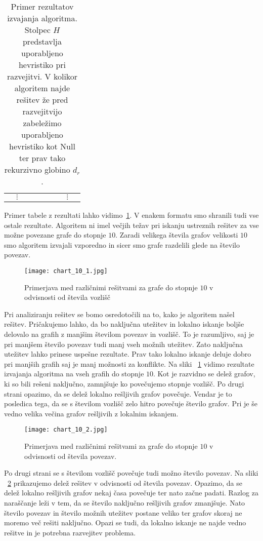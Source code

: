 \documentclass[12pt,a4paper,twoside]{article}
\theoremstyle{definition} %
\theoremstyle{plain} %
\numberwithin{equation}{section}  %
\begin{document}
\begin{table}[]
\begin{tabular}{lllllllll}
                                   & $\vdots$                          &                                   &                                      &                                 &                                         &                                       & $\vdots$                              &                                    
\end{tabular}
\label{tbl:res}
\caption{Primer rezultatov izvajanja algoritma. Stolpec $H$ predstavlja uporabljeno hevristiko pri razvejitvi. V kolikor algoritem najde rešitev že pred razvejitvijo zabeležimo uporabljeno hevristiko kot Null ter prav tako rekurzivno globino $d_r$.}
\end{table}
Primer tabele z rezultati lahko vidimo~\ref{tbl:res}. V enakem formatu smo shranili tudi vse ostale rezultate.
Algoritem ni imel večjih težav pri iskanju ustreznih rešitev za vse možne povezane grafe do stopnje $10$. Zaradi velikega števila grafov velikosti $10$ smo algoritem izvajali vzporedno in sicer smo grafe razdelili glede na število povezav.
 \begin{figure}[h!]
\caption{Primerjava med različnimi rešitvami za grafe do stopnje $10$ v odvisnosti od števila vozlišč}
\label{chart_10_1}
\centering
    \texttt{[image: chart\_10\_1.jpg]}
    \end{figure}

Pri analiziranju rešitev se bomo osredotočili na to, kako je algoritem našel rešitev. Pričakujemo lahko, da bo naključna utežitev in lokalno iskanje boljše delovalo na grafih z manjšim številom povezav in vozlišč. To je razumljivo, saj je pri manjšem število povezav tudi manj vseh možnih utežitev. Zato naključna utežitev lahko prinese uspešne rezultate. Prav tako lokalno iskanje deluje dobro pri manjših grafih saj je manj možnosti za konflikte. Na sliki ~\ref{chart_10_1} vidimo rezultate izvajanja algoritma na vseh grafih do stopnje $10$. Kot je razvidno se delež grafov, ki so bili rešeni naključno, zamnjšuje ko povečujemo stopnje vozlišč. Po drugi strani opazimo, da se delež lokalno rešljivih grafov povečuje. Vendar je to posledica tega, da se s številom vozlišč zelo hitro povečuje število grafov. Pri je še vedno velika večina grafov rešljivih z lokalnim iskanjem.
 \begin{figure}[h!]
\caption{Primerjava med različnimi rešitvami za grafe do stopnje $10$ v odvisnosti od števila povezav.}
\label{chart_10_2}
\centering
    \texttt{[image: chart\_10\_2.jpg]}
    \end{figure}
Po drugi strani se s številom vozlišč povečuje tudi možno število povezav. Na sliki ~\ref{chart_10_2} prikazujemo delež rešitev v odvisnosti od števila povezav. Opazimo, da se delež lokalno rešljivih grafov nekaj časa povečuje ter nato začne padati. Razlog za naraščanje leži v tem, da se število naključno rešljivih grafov zmanjšuje. Nato število povezav in število možnih utežitev postane veliko ter grafov skoraj ne moremo več rešiti naključno. Opazi se tudi, da lokalno iskanje ne najde vedno rešitve in je potrebna razvejitev problema.
\end{document}
